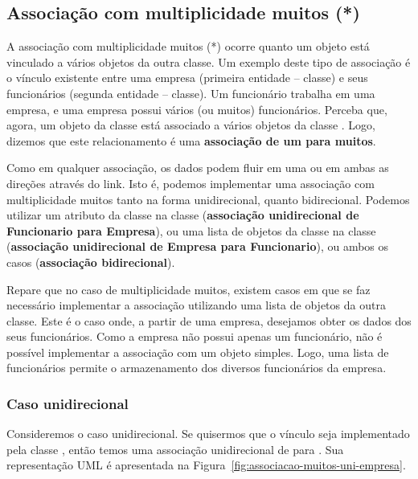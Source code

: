 \subsection{Associação com multiplicidade muitos (*)}
 
A associação com multiplicidade muitos (*) ocorre quanto um objeto está vinculado a vários objetos da outra classe. Um exemplo deste tipo de associação é o vínculo existente entre uma empresa (primeira entidade -- classe) e seus funcionários (segunda entidade -- classe). Um funcionário trabalha em uma empresa, e uma empresa possui vários (ou muitos) funcionários. Perceba que, agora, um objeto da classe  está associado a vários objetos da classe . Logo, dizemos que este relacionamento é uma \textbf{associação de um para muitos}.

Como em qualquer associação, os dados podem fluir em uma ou em ambas as direções através do link. Isto é, podemos implementar uma associação com multiplicidade muitos tanto na forma unidirecional, quanto bidirecional. Podemos utilizar um atributo da classe  na classe  (\textbf{associação unidirecional de Funcionario para Empresa}), ou uma lista de objetos da classe  na classe  (\textbf{associação unidirecional de Empresa para Funcionario}), ou ambos os casos (\textbf{associação bidirecional}). 

Repare que no caso de multiplicidade muitos, existem casos em que se faz necessário implementar a associação utilizando uma lista de objetos da outra classe. Este é o caso onde, a partir de uma empresa, desejamos obter os dados dos seus funcionários. Como a empresa não possui apenas um funcionário, não é possível implementar a associação com um objeto simples. Logo, uma lista de funcionários permite o armazenamento dos diversos funcionários da empresa.

\subsubsection{Caso unidirecional}

Consideremos o caso unidirecional. Se quisermos que o vínculo seja implementado pela classe , então temos uma associação unidirecional de  para . Sua representação UML é apresentada na Figura~\ref{fig:associacao-muitos-uni-empresa}.

